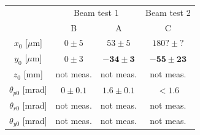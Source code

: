 \documentclass[a4paper,11pt]{book}
\begin{document}
\begin{center}
 \begin{tabular}{|c||c|c|c|}\hline
 &\multicolumn{2}{|c|}{Beam test 1}& Beam test 2\\\cline{2-4}
 & B & A &C\\\hline\hline
$x_0$ [$\mu$m] & $0\pm5$ & $53\pm5$ &$180?\pm?$\\
$y_0$ [$\mu$m]& $0\pm3$ & $\boldsymbol{-34\pm3}$ &$\boldsymbol{-55\pm23}$\\
$z_0$ [mm]& not meas. & not meas. & not meas.\\
$\theta_{p0}$ [mrad]& $0\pm0.1$ & $\boldsymbol{1.6\pm0.1}$ & $\boldsymbol{<1.6}$\\
$\theta_{r0}$ [mrad]& not meas.&not meas.&not meas.\\
$\theta_{y0}$ [mrad]& not meas.&not meas.&not meas.\\\hline
\end{tabular}
\end{center}
\end{document}
